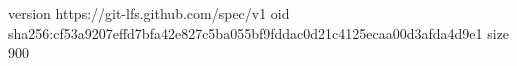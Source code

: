 version https://git-lfs.github.com/spec/v1
oid sha256:cf53a9207effd7bfa42e827c5ba055bf9fddac0d21c4125ecaa00d3afda4d9e1
size 900
